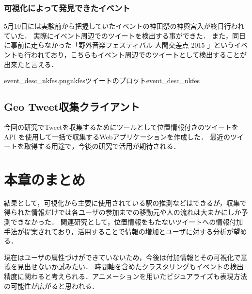 \subsubsection{可視化によって発見できたイベント}
5月10日には実験前から把握していたイベントの神田祭の神輿宮入が終日行われていた\cite{webpage_kanda}．
実際にイベント周辺でのツイートを検出する事ができた．
また，同日に事前に走らなかった「野外音楽フェスティバル 人間交差点 2015 \cite{webpage_nkfes}」というイベントも行われており，こちらもイベント周辺でのツイートとして検出することが出来たと言える．


{event_desc_nkfes.png}{nkfesツイートのプロット}{event_desc_nkfes}


\subsection{Geo Tweet収集クライアント}
今回の研究でTweetを収集するためにツールとして位置情報付きのツイートを API を使用して一括で収集するWebアプリケーションを作成した．
最近のツイートを取得する用途で，今後の研究で活用が期待される．


\section{本章のまとめ}
結果として，可視化から主要に使用されている駅の推測などはできるが，収集で得られた情報だけでは各ユーザの参加までの移動元や人の流れは大まかにしか予測できなかった．
関連研究として，位置情報をもたないツイートへの情報付加手法が提案されており\cite{twitterlocalevent}，活用することで情報の増加とユーザに対する分析が望める．

現在はユーザの属性づけができていないため，今後は付加情報とその可視化で意義を見出せないか試みたい．
時間軸を含めたクラスタリングもイベントの検出精度に関わると考えられる．アニメーションを用いたビジュアライズも表現方法の可能性が広がると思われる．

\newpage
